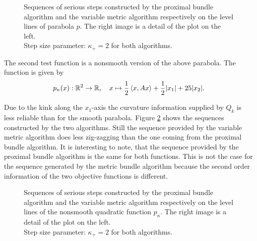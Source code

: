 \begin{figure}[H]
	\begin{subfigure}[t]{0.49\textwidth}
	\end{subfigure}
	\begin{subfigure}[t]{0.49\textwidth}
	\end{subfigure}
	\caption[Serious steps on parabola]{Sequences of serious steps constructed by the proximal bundle algorithm and the variable metric algorithm respectively on the level lines of parabola \(p\). The right image is a detail of the plot on the left.\\
	Step size parameter: \(\kappa_+ = 2\) for both algorithms.}
	\label{fig_contour_parab}
\end{figure}

The second test function is a nonsmooth version of the above parabola. The function is given by 
\[ p_n(x): \mathbb{R}^2 \to \mathbb{R}, \quad x \mapsto \frac{1}{2}\left\langle x, Ax \right\rangle + \frac{1}{2}|x_1|+25|x_2|. \]

Due to the kink along the \(x_1\)-axis the curvature information supplied by \(Q_k\) is less reliable than for the smooth parabola.
Figure \ref{fig_contour_nonsm_parab} shows the sequences constructed by the two algorithms. Still the sequence provided by the variable metric algorithm does less zig-zagging than the one coming from the proximal bundle algorithm.
It is interesting to note, that the sequence provided by the proximal bundle algorithm is the same for both functions. This is not the case for the sequence generated by the metric bundle algorithm because the second order information of the two objective functions is different.

\begin{figure}[H]
	\begin{subfigure}[t]{0.49\textwidth}
	\end{subfigure}
	\begin{subfigure}[t]{0.49\textwidth}
	\end{subfigure}
	\caption[Serious steps on nonsmooth quadratic]{Sequences of serious steps constructed by the proximal bundle algorithm and the variable metric algorithm respectively on the level lines of the nonsmooth quadratic function \(p_n\). The right image is a detail of the plot on the left.\\
	Step size parameter: \(\kappa_+ = 2\) for both algorithms.}
	\label{fig_contour_nonsm_parab}
\end{figure}

